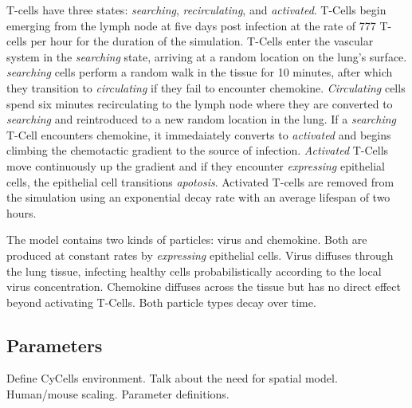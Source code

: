 \documentclass[10pt]{article}
\begin{document}
T-cells have three states: \emph{searching}, \emph{recirculating}, and \emph{activated}. T-Cells begin emerging from the lymph node at five days post infection at the rate of 777 T-cells per hour for the duration of the simulation. T-Cells enter the vascular system in the \emph{searching} state, arriving at a random location on the lung's surface. \emph{searching} cells perform a random walk in the tissue for 10 minutes, after which they transition to \emph{circulating} if they fail to encounter chemokine. \emph{Circulating} cells spend six minutes recirculating to the lymph node where they are converted to \emph{searching} and reintroduced to a new random location in the lung. If a \emph{searching} T-Cell encounters chemokine, it immedaiately converts to \emph{activated} and begins climbing the chemotactic gradient to the source of infection. \emph{Activated} T-Cells move continuously up the gradient and if they encounter \emph{expressing} epithelial cells, the epithelial cell transitions \emph{apotosis}. Activated T-cells are removed from the simulation using an exponential decay rate with an average lifespan of two hours. 

The model contains two kinds of particles: virus and chemokine. Both are produced at constant rates by \emph{expressing} epithelial cells.  Virus diffuses through the lung tissue, infecting healthy cells probabilistically according to the local virus concentration. Chemokine diffuses across the tissue but has no
direct effect beyond activating T-Cells. Both particle types decay over time.


\subsection*{Parameters}

Define CyCells environment.  Talk about the need for spatial model.  Human/mouse scaling.  Parameter definitions. 
\end{document}
